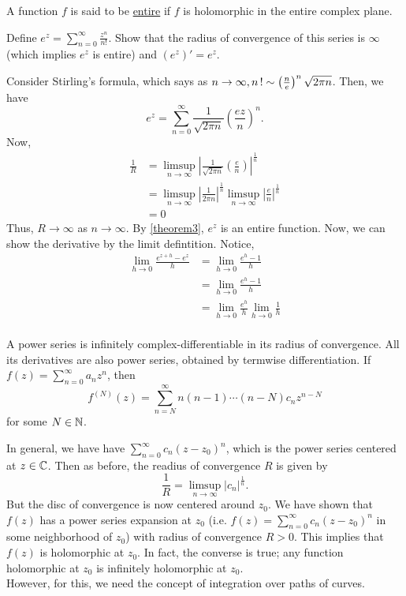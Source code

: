 \documentclass[11pt]{article}
\begin{document}
\begin{definition}
A function $f$ is said to be \underline{entire} if $f$ is holomorphic in the
entire complex plane.
\end{definition}
\begin{example}
Define $\displaystyle e^z = \sum^\infty_{n=0}\frac{z^n}{n!}$. Show that the
radius of convergence of this series is $\infty$ (which implies $e^z$ is entire)
and $(e^z)' = e^z$.
\end{example}
Consider Stirling's formula, which says as $n\to\infty, n\operatorname{!} \sim
\left(\frac{n}{e}\right)^n\sqrt{2\pi n}$. Then, we have
\begin{equation*}
e^z = \sum^\infty_{n=0} \frac{1}{\sqrt{2\pi n}}\left( \frac{ez}{n}\right)^n.
\end{equation*}
Now,
\begin{align*}
\frac{1}{R}
&= \limsup_{n\to\infty}\left| \frac{1}{\sqrt{2\pi
n}}\left(\frac{e}{n}\right)\right|^{\frac{1}{n}}\\
&= \limsup_{n\to\infty}\left| \frac{1}{2\pi n} \right|^{\frac{1}{n}}
\limsup_{n\to\infty}\left| \frac{e}{n} \right|^{\frac{1}{n}}\\
&= 0
\end{align*}
Thus, $R \to \infty$ as $n \to \infty$. By \cref{theorem3}, $e^z$ is an entire
function. Now, we can show the derivative by the limit defintition. Notice,
\begin{align*}
\lim_{h \to 0}\frac{e^{z+h} - e^z}{h}
&= \lim_{h \to 0}\frac{e^{h} - 1}{h}\\
&= \lim_{h \to 0}\frac{e^{h} - 1}{h}\\
&= \lim_{h \to 0}\frac{e^{h}}{h}\lim_{h \to 0}\frac{1}{h}\\
\end{align*}

\begin{corollary}
A power series is infinitely complex-differentiable in its radius of
convergence. All its derivatives are also power series, obtained by termwise
differentiation. If $\displaystyle f(z) = \sum^\infty_{n=0}a_nz^n$, then
\begin{equation*}
f^{(N)}(z) = \sum^\infty_{n=N}n(n-1)\cdots(n-N)c_nz^{n-N}
\end{equation*}
for some $N \in \mathbb{N}$.
\end{corollary}
In general, we have have $\displaystyle \sum^\infty_{n=0} c_n(z - z_0)^n$, which
is the power series centered at $z \in \mathbb{C}$. Then as before, the readius of
convergence $R$ is given by
\begin{equation*}
\frac{1}{R} = \limsup_{n\to\infty} |c_n|^{\frac{1}{n}}.
\end{equation*}
But the disc of convergence is now centered around $z_0$. We have shown that
$f(z)$ has a power series expansion at $z_0$ (i.e. $\displaystyle f(z) =
\sum^\infty_{n=0}c_n(z - z_0)^n$ in some neighborhood of $z_0$) with radius of
convergence $R > 0$. This implies that $f(z)$ is holomorphic at $z_0$. In fact,
the converse is true; any function holomorphic at $z_0$ is infinitely
holomorphic at $z_0$.\\
However, for this, we need the concept of integration over paths of curves.
\end{document}
